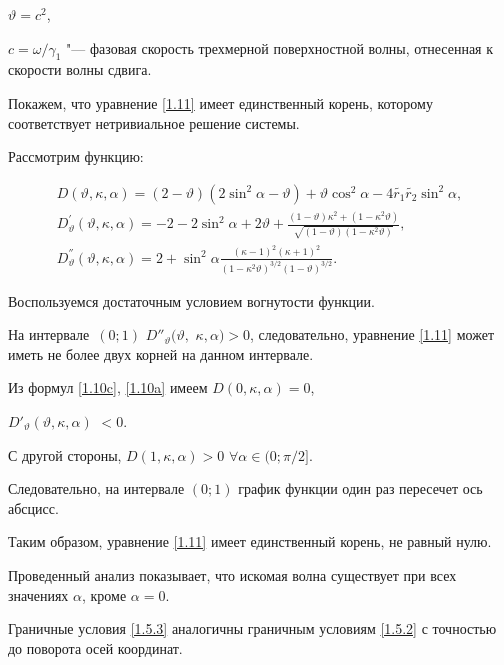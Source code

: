 $\vartheta=c^2$,

$c={\omega}/{\gamma_1}$ "--- фазовая скорость трехмерной поверхностной волны, отнесенная к скорости волны сдвига.



Покажем, что уравнение \eqref{1.11} имеет единственный корень, которому соответствует нетривиальное решение системы. 

Рассмотрим функцию:

\begin{gather}

D(\vartheta, \kappa, \alpha) = (2 - \vartheta)(2 \sin^2 \alpha - \vartheta) + \vartheta\cos^2\alpha - 4\widetilde{r_1}\widetilde{r_2}\sin^2\alpha, \label{1.10c} \\

D^{'}_{\vartheta}(\vartheta, \kappa, \alpha) = -2 - 2\sin^2 \alpha + 2\vartheta + \frac{(1-\vartheta)\kappa^2+(1-\kappa^2\vartheta)}{\sqrt{(1-\vartheta)(1-\kappa^2\vartheta)}}, \label{1.10a} \\

D^{''}_{\vartheta}(\vartheta, \kappa, \alpha) = 2 + \sin^2 \alpha \frac{(\kappa-1)^2(\kappa+1)^2}{(1-\kappa^2\vartheta)^{{3}/{2}}(1-\vartheta)^{{3}/{2}}}. \label{1.10b}

\end{gather}



Воспользуемся достаточным условием вогнутости функции. 

На интервале~$(0; 1)$  $D''_{\vartheta}(\vartheta,$ $ \kappa, \alpha)>0$, следовательно, уравнение \eqref{1.11} может иметь не более двух корней на данном интервале. 

Из формул \eqref{1.10c}, \eqref{1.10a} имеем $D(0, \kappa, \alpha) = 0$, 

$D'_{\vartheta}(\vartheta, \kappa, \alpha)$ $ < 0 $. 

С другой стороны,   $D(1, \kappa, \alpha) > 0$ $\forall\alpha\in(0; {\pi}/{2}]$.



Следовательно, на интервале $(0; 1)$ график функции один раз пересечет ось абсцисс. 

Таким образом, уравнение \eqref{1.11} имеет единственный корень, не равный нулю. 

Проведенный анализ показывает, что искомая волна существует при всех значениях $\alpha$, кроме $\alpha = 0$. 



Граничные условия \eqref{1.5.3} аналогичны граничным условиям \eqref{1.5.2} с точностью до поворота осей координат. 

